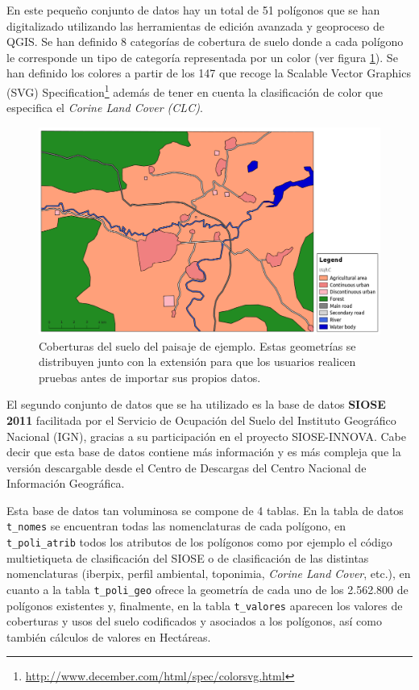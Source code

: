 En este pequeño conjunto de datos hay un total de 51 polígonos que se han digitalizado utilizando las herramientas de edición avanzada y geoproceso de QGIS. Se han definido 8 categorías de cobertura de suelo donde a cada polígono le corresponde un tipo de categoría representada por un color (ver figura \ref{fig:zona_andrea}). Se han definido los colores a partir de los 147 que recoge la Scalable Vector Graphics (SVG) Specification\footnote{\url{http://www.december.com/html/spec/colorsvg.html}} además de tener en cuenta la clasificación de color que especifica el \textit{Corine Land Cover (CLC)}.

\begin{figure}
\begin{center}
\includegraphics[width=\textwidth]{Metodologia/Figs/zona_andrea.png}
\caption{Coberturas del suelo del paisaje de ejemplo. Estas geometrías se distribuyen junto con la extensión \pgland{} para que los usuarios realicen pruebas antes de importar sus propios datos. \label{fig:zona_andrea}}
\end{center}
\end{figure}

El segundo conjunto de datos que se ha utilizado es la base de datos \textbf{SIOSE 2011} facilitada por el Servicio de Ocupación del Suelo del Instituto Geográfico Nacional (IGN), gracias a su participación en el proyecto SIOSE-INNOVA. Cabe decir que esta base de datos contiene más información y es más compleja que la versión descargable desde el Centro de Descargas del Centro Nacional de Información Geográfica.

Esta base de datos tan voluminosa se compone de 4 tablas. En la tabla de datos \texttt{t\_nomes} se encuentran todas las nomenclaturas de cada polígono, en \texttt{t\_poli\_atrib} todos los atributos de los polígonos como por ejemplo el código multietiqueta de clasificación del SIOSE o de clasificación de las distintas nomenclaturas (iberpix, perfil ambiental, toponimia, \textit{Corine Land Cover}, etc.), en cuanto a la tabla \texttt{t\_poli\_geo} ofrece la geometría de cada uno de los 2.562.800 de polígonos existentes y, finalmente, en la tabla \texttt{t\_valores} aparecen los valores de coberturas y usos del suelo codificados y asociados a los polígonos, así como también cálculos de valores en Hectáreas.


